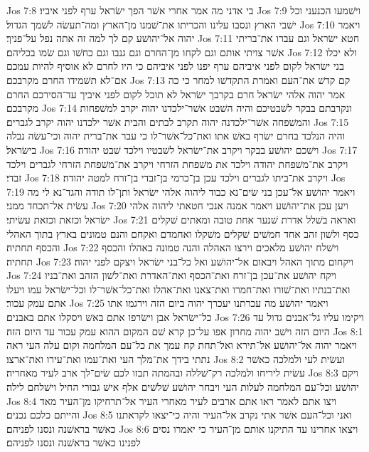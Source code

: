 Jos 7:8  בי אדני מה אמר אחרי אשׁר הפך ישׂראל ערף לפני איביו׃
Jos 7:9  וישׁמעו הכנעני וכל ישׁבי הארץ ונסבו עלינו והכריתו את־שׁמנו מן־הארץ ומה־תעשׂה לשׁמך הגדול׃
Jos 7:10  ויאמר יהוה אל־יהושׁע קם לך למה זה אתה נפל על־פניך׃
Jos 7:11  חטא ישׂראל וגם עברו את־בריתי אשׁר צויתי אותם וגם לקחו מן־החרם וגם גנבו וגם כחשׁו וגם שׂמו בכליהם׃
Jos 7:12  ולא יכלו בני ישׂראל לקום לפני איביהם ערף יפנו לפני איביהם כי היו לחרם לא אוסיף להיות עמכם אם־לא תשׁמידו החרם מקרבכם׃
Jos 7:13  קם קדשׁ את־העם ואמרת התקדשׁו למחר כי כה אמר יהוה אלהי ישׂראל חרם בקרבך ישׂראל לא תוכל לקום לפני איביך עד־הסירכם החרם מקרבכם׃
Jos 7:14  ונקרבתם בבקר לשׁבטיכם והיה השׁבט אשׁר־ילכדנו יהוה יקרב למשׁפחות והמשׁפחה אשׁר־ילכדנה יהוה תקרב לבתים והבית אשׁר ילכדנו יהוה יקרב לגברים׃
Jos 7:15  והיה הנלכד בחרם ישׂרף באשׁ אתו ואת־כל־אשׁר־לו כי עבר את־ברית יהוה וכי־עשׂה נבלה בישׂראל׃
Jos 7:16  וישׁכם יהושׁע בבקר ויקרב את־ישׂראל לשׁבטיו וילכד שׁבט יהודה׃
Jos 7:17  ויקרב את־משׁפחת יהודה וילכד את משׁפחת הזרחי ויקרב את־משׁפחת הזרחי לגברים וילכד זבדי׃
Jos 7:18  ויקרב את־ביתו לגברים וילכד עכן בן־כרמי בן־זבדי בן־זרח למטה יהודה׃
Jos 7:19  ויאמר יהושׁע אל־עכן בני שׂים־נא כבוד ליהוה אלהי ישׂראל ותן־לו תודה והגד־נא לי מה עשׂית אל־תכחד ממני׃
Jos 7:20  ויען עכן את־יהושׁע ויאמר אמנה אנכי חטאתי ליהוה אלהי ישׂראל וכזאת וכזאת עשׂיתי׃
Jos 7:21  ואראה בשׁלל אדרת שׁנער אחת טובה ומאתים שׁקלים כסף ולשׁון זהב אחד חמשׁים שׁקלים משׁקלו ואחמדם ואקחם והנם טמונים בארץ בתוך האהלי והכסף תחתיה׃
Jos 7:22  וישׁלח יהושׁע מלאכים וירצו האהלה והנה טמונה באהלו והכסף תחתיה׃
Jos 7:23  ויקחום מתוך האהל ויבאום אל־יהושׁע ואל כל־בני ישׂראל ויצקם לפני יהוה׃
Jos 7:24  ויקח יהושׁע את־עכן בן־זרח ואת־הכסף ואת־האדרת ואת־לשׁון הזהב ואת־בניו ואת־בנתיו ואת־שׁורו ואת־חמרו ואת־צאנו ואת־אהלו ואת־כל־אשׁר־לו וכל־ישׂראל עמו ויעלו אתם עמק עכור׃
Jos 7:25  ויאמר יהושׁע מה עכרתנו יעכרך יהוה ביום הזה וירגמו אתו כל־ישׂראל אבן וישׂרפו אתם באשׁ ויסקלו אתם באבנים׃
Jos 7:26  ויקימו עליו גל־אבנים גדול עד היום הזה וישׁב יהוה מחרון אפו על־כן קרא שׁם המקום ההוא עמק עכור עד היום הזה׃
Jos 8:1  ויאמר יהוה אל־יהושׁע אל־תירא ואל־תחת קח עמך את כל־עם המלחמה וקום עלה העי ראה נתתי בידך את־מלך העי ואת־עמו ואת־עירו ואת־ארצו׃
Jos 8:2  ועשׂית לעי ולמלכה כאשׁר עשׂית ליריחו ולמלכה רק־שׁללה ובהמתה תבזו לכם שׂים־לך ארב לעיר מאחריה׃
Jos 8:3  ויקם יהושׁע וכל־עם המלחמה לעלות העי ויבחר יהושׁע שׁלשׁים אלף אישׁ גבורי החיל וישׁלחם לילה׃
Jos 8:4  ויצו אתם לאמר ראו אתם ארבים לעיר מאחרי העיר אל־תרחיקו מן־העיר מאד והייתם כלכם נכנים׃
Jos 8:5  ואני וכל־העם אשׁר אתי נקרב אל־העיר והיה כי־יצאו לקראתנו כאשׁר בראשׁנה ונסנו לפניהם׃
Jos 8:6  ויצאו אחרינו עד התיקנו אותם מן־העיר כי יאמרו נסים לפנינו כאשׁר בראשׁנה ונסנו לפניהם׃
